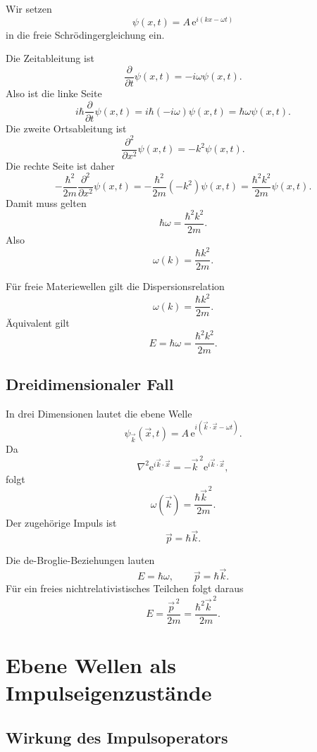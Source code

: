 \begin{derivationbox}
Wir setzen
\[
    \psi(x,t)=A\,\mathrm{e}^{i(kx-\omega t)}
\]
in die freie Schrödingergleichung ein.

Die Zeitableitung ist
\[
    \frac{\partial}{\partial t}\psi(x,t)
    =-i\omega\psi(x,t).
\]
Also ist die linke Seite
\[
    i\hbar\frac{\partial}{\partial t}\psi(x,t)
    =i\hbar(-i\omega)\psi(x,t)
    =\hbar\omega\psi(x,t).
\]
Die zweite Ortsableitung ist
\[
    \frac{\partial^2}{\partial x^2}\psi(x,t)
    =-k^2\psi(x,t).
\]
Die rechte Seite ist daher
\[
    -\frac{\hbar^2}{2m}\frac{\partial^2}{\partial x^2}\psi(x,t)
    =-\frac{\hbar^2}{2m}(-k^2)\psi(x,t)
    =\frac{\hbar^2k^2}{2m}\psi(x,t).
\]
Damit muss gelten
\[
    \hbar\omega=\frac{\hbar^2k^2}{2m}.
\]
Also
\[
    \omega(k)=\frac{\hbar k^2}{2m}.
\]
\end{derivationbox}

\begin{formulabox}
Für freie Materiewellen gilt die Dispersionsrelation
\[
    \omega(k)=\frac{\hbar k^2}{2m}.
\]
Äquivalent gilt
\[
    E=\hbar\omega=\frac{\hbar^2k^2}{2m}.
\]
\end{formulabox}

\subsection{Dreidimensionaler Fall}

In drei Dimensionen lautet die ebene Welle
\[
    \psi_{\vec{k}}(\vec{x},t)=A\,\mathrm{e}^{i(\vec{k}\cdot\vec{x}-\omega t)}.
\]
Da
\[
    \nabla^2\mathrm{e}^{i\vec{k}\cdot\vec{x}}
    =-\vec{k}^{\,2}\mathrm{e}^{i\vec{k}\cdot\vec{x}},
\]
folgt
\[
    \omega(\vec{k})=\frac{\hbar\vec{k}^{\,2}}{2m}.
\]
Der zugehörige Impuls ist
\[
    \vec{p}=\hbar\vec{k}.
\]

\begin{definitionbox}
Die de-Broglie-Beziehungen lauten
\[
    E=\hbar\omega,
    \qquad
    \vec{p}=\hbar\vec{k}.
\]
Für ein freies nichtrelativistisches Teilchen folgt daraus
\[
    E=\frac{\vec{p}^{\,2}}{2m}
    =\frac{\hbar^2\vec{k}^{\,2}}{2m}.
\]
\end{definitionbox}

\section{Ebene Wellen als Impulseigenzustände}

\subsection{Wirkung des Impulsoperators}

